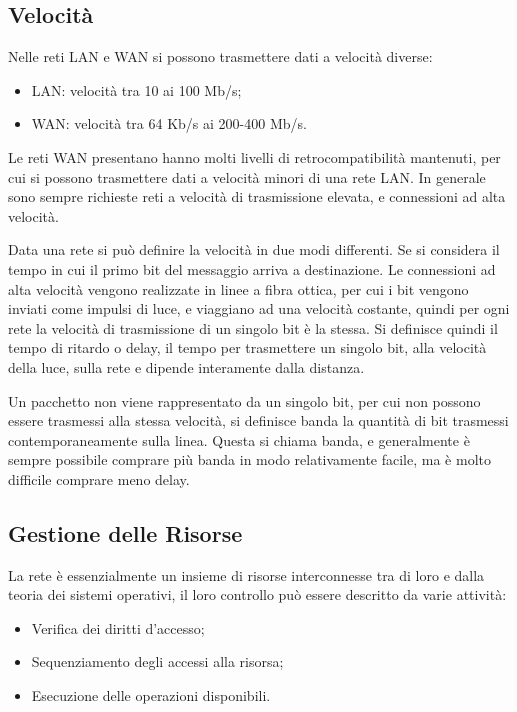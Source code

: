 \documentclass{article}
\numberwithin{equation}{subsection}
\begin{document}
\subsection{Velocità}

Nelle reti LAN e WAN  si possono trasmettere dati a velocità diverse:
\begin{itemize}
  \item LAN: velocità tra 10 ai 100 Mb/s;
  \item WAN: velocità tra 64 Kb/s ai 200-400 Mb/s. 
\end{itemize} 

Le reti WAN presentano hanno molti livelli di retrocompatibilità mantenuti, per cui si possono trasmettere dati a velocità minori di una rete LAN. 
In generale sono sempre richieste reti a velocità di trasmissione elevata, e connessioni ad alta velocità. 

Data una rete si può definire la velocità in due modi differenti. Se si considera il tempo in cui il primo bit del messaggio arriva a destinazione. Le connessioni ad 
alta velocità vengono realizzate in linee a fibra ottica, per cui i bit vengono inviati come impulsi di luce, e viaggiano ad una velocità costante, quindi per ogni rete 
la velocità di trasmissione di un singolo bit è la stessa. Si definisce quindi il tempo di ritardo o delay, il tempo per trasmettere un singolo bit, alla velocità della luce, sulla 
rete e dipende interamente dalla distanza. 

Un pacchetto non viene rappresentato da un singolo bit, per cui non possono essere trasmessi alla stessa velocità, si definisce banda la quantità di bit trasmessi 
contemporaneamente sulla linea. Questa si chiama banda, e generalmente è sempre possibile comprare più banda in modo relativamente facile, ma è molto difficile comprare meno delay. 

\subsection{Gestione delle Risorse}

La rete è essenzialmente un insieme di risorse interconnesse tra di loro e dalla teoria dei sistemi operativi, il loro controllo può essere descritto da varie attività:
\begin{itemize}
  \item Verifica dei diritti d'accesso;
  \item Sequenziamento degli accessi alla risorsa;
  \item Esecuzione delle operazioni disponibili. 
\end{itemize}
\end{document}
